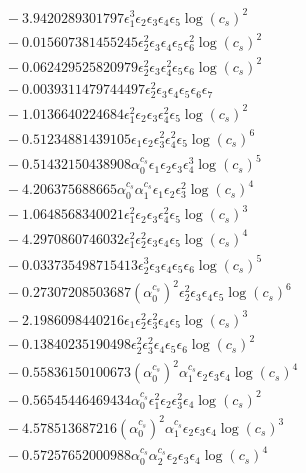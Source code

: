 \documentclass[10pt]{article}
\begin{document}
\begin{align*}
&{}  - 3.9420289301797 \epsilon_{1}^{3} \epsilon_{2} \epsilon_{3} \epsilon_{4} \epsilon_{5} \log{\left(c_{s} \right)}^{2} \\
&{}  - 0.015607381455245 \epsilon_{2}^{2} \epsilon_{3} \epsilon_{4} \epsilon_{5} \epsilon_{6}^{2} \log{\left(c_{s} \right)}^{2} \\
&{}  - 0.062429525820979 \epsilon_{2}^{2} \epsilon_{3} \epsilon_{4}^{2} \epsilon_{5} \epsilon_{6} \log{\left(c_{s} \right)}^{2} \\
&{}  - 0.0039311479744497 \epsilon_{2}^{2} \epsilon_{3} \epsilon_{4} \epsilon_{5} \epsilon_{6} \epsilon_{7} \\
&{}  - 1.0136640224684 \epsilon_{1}^{2} \epsilon_{2} \epsilon_{3} \epsilon_{4}^{2} \epsilon_{5} \log{\left(c_{s} \right)}^{2} \\
&{}  - 0.51234881439105 \epsilon_{1} \epsilon_{2} \epsilon_{3}^{2} \epsilon_{4}^{2} \epsilon_{5} \log{\left(c_{s} \right)}^{6} \\
&{}  - 0.51432150438908 \alpha_{0}^{c_s} \epsilon_{1} \epsilon_{2} \epsilon_{3} \epsilon_{4}^{3} \log{\left(c_{s} \right)}^{5} \\
&{}  - 4.206375688665 \alpha_{0}^{c_s} \alpha_{1}^{c_s} \epsilon_{1} \epsilon_{2} \epsilon_{3}^{2} \log{\left(c_{s} \right)}^{4} \\
&{}  - 1.0648568340021 \epsilon_{1}^{2} \epsilon_{2} \epsilon_{3} \epsilon_{4}^{2} \epsilon_{5} \log{\left(c_{s} \right)}^{3} \\
&{}  - 4.2970860746032 \epsilon_{1}^{2} \epsilon_{2}^{2} \epsilon_{3} \epsilon_{4} \epsilon_{5} \log{\left(c_{s} \right)}^{4} \\
&{}  - 0.033735498715413 \epsilon_{2}^{3} \epsilon_{3} \epsilon_{4} \epsilon_{5} \epsilon_{6} \log{\left(c_{s} \right)}^{5} \\
&{}  - 0.27307208503687 \left(\alpha_{0}^{c_s}\right)^{2} \epsilon_{2}^{2} \epsilon_{3} \epsilon_{4} \epsilon_{5} \log{\left(c_{s} \right)}^{6} \\
&{}  - 2.1986098440216 \epsilon_{1} \epsilon_{2}^{2} \epsilon_{3}^{2} \epsilon_{4} \epsilon_{5} \log{\left(c_{s} \right)}^{3} \\
&{}  - 0.13840235190498 \epsilon_{2}^{2} \epsilon_{3}^{2} \epsilon_{4} \epsilon_{5} \epsilon_{6} \log{\left(c_{s} \right)}^{2} \\
&{}  - 0.55836150100673 \left(\alpha_{0}^{c_s}\right)^{2} \alpha_{1}^{c_s} \epsilon_{2} \epsilon_{3} \epsilon_{4} \log{\left(c_{s} \right)}^{4} \\
&{}  - 0.56545446469434 \alpha_{0}^{c_s} \epsilon_{1}^{2} \epsilon_{2} \epsilon_{3}^{2} \epsilon_{4} \log{\left(c_{s} \right)}^{2} \\
&{}  - 4.578513687216 \left(\alpha_{0}^{c_s}\right)^{2} \alpha_{1}^{c_s} \epsilon_{2} \epsilon_{3} \epsilon_{4} \log{\left(c_{s} \right)}^{3} \\
&{}  - 0.57257652000988 \alpha_{0}^{c_s} \alpha_{2}^{c_s} \epsilon_{2} \epsilon_{3} \epsilon_{4} \log{\left(c_{s} \right)}^{4}
\end{align*}
\end{document}
